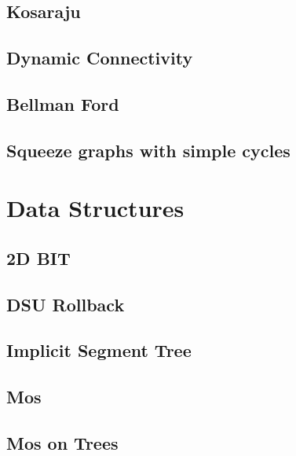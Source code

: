 \subsection{   Kosaraju}
\raggedbottom
\hrulefill
\subsection{   Dynamic Connectivity}
\raggedbottom
\hrulefill
\subsection{   Bellman Ford}
\raggedbottom
\hrulefill
\subsection{   Squeeze graphs with simple cycles}
\raggedbottom
\hrulefill

\section{Data Structures}
\subsection{   2D BIT}
\raggedbottom
\hrulefill
\subsection{   DSU Rollback}
\raggedbottom
\hrulefill
\subsection{   Implicit Segment Tree}
\raggedbottom
\hrulefill
\subsection{   Mos}
\raggedbottom
\hrulefill
\subsection{   Mos on Trees}
\raggedbottom
\hrulefill

